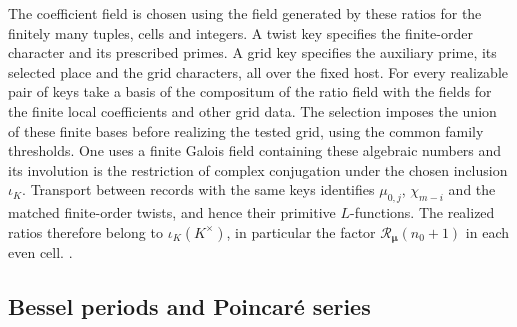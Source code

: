 The coefficient field is chosen using the field generated by these
ratios for the finitely many tuples, cells and integers. A twist key
specifies the finite-order character and its prescribed primes.
A grid key specifies the auxiliary prime, its selected place and
the grid characters, all over the fixed host. For every realizable
pair of keys take a basis of the compositum of the ratio field with
the fields for the finite local coefficients and other grid data.
The selection imposes the union of these finite bases before
realizing the tested grid, using the common family thresholds.
One uses a finite Galois field containing these algebraic numbers
and its involution is the restriction of complex conjugation under
the chosen inclusion \(\iota_K\). Transport between records with
the same keys identifies \(\mu_{0,j}\), \(\chi_{m-i}\) and the
matched finite-order twists, and hence their primitive
\(L\)-functions. The realized ratios therefore belong to
\(\iota_K(K^\times)\), in particular the factor
\(\mathcal R_{\boldsymbol\mu}(n_0+1)\) in each even cell.
.

\subsection{Bessel periods and Poincar\'e series}
\label{sec:bessel}

